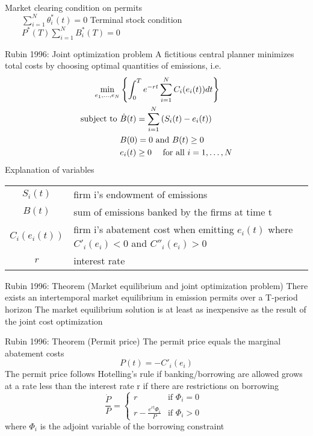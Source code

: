 	Market clearing condition on permits \\
		$
		\qquad \sum_{i=1}^N \theta_i^*(t) = 0
		$
 Terminal stock condition \\
		$
		\qquad P^*(T)\sum_{i=1}^N B^*_i(T) = 0
		$




Rubin 1996: Joint optimization problem
	A fictitious central planner minimizes total costs by choosing optimal quantities of emissions, i.e.
		\begin{align}
		\min_{e_1, \ldots, e_N} &\left\{ \int_0^T e^{-rt} \sum_{i=1}^N C_i(e_i(t)) dt \right\} \\
		\textnormal{subject to }
		&\dot{B}(t) = \sum_{i=1}^N \left(S_i(t) - e_i(t)\right) \\
		&            B(0) = 0 \textnormal{ and } B(t) \ge 0 \\
		&            e_i(t) \ge 0 \quad \textnormal{ for all } i = 1, \ldots, N
		\end{align}
	{Explanation of variables}
		\begin{tiny}
		\begin{tabular}{cl}
		$S_i(t)$ & firm i's endowment of emissions \\
		$B(t)$ & sum of emissions banked by the firms at time t\\
		$C_i(e_i(t))$ & firm i's abatement cost when emitting $e_i(t)$ where $C'_i(e_i) < 0$ and $C''_i(e_i) > 0$ \\
		$r$ & interest rate \\
		\end{tabular}
		\end{tiny}


Rubin 1996: Theorem (Market equilibrium and joint optimization problem)
	There exists an intertemporal market equilibrium in emission permits over a T-period horizon
	The market equilibrium solution is at least as inexpensive as the result of the joint cost optimization


Rubin 1996: Theorem (Permit price)
	The permit price equals the marginal abatement costs
		\[
		P(t) = - C'_i(e_i)
		\]
	The permit price 
		follows Hotelling's rule if banking/borrowing are allowed
		grows at a rate less than the interest rate r if there are restrictions on borrowing
		\[
		\frac{\dot{P}}{P} =
				\left\{ \begin{array}{ll}
					r  &
						\mbox{if $\Phi_i = 0$ } \\
					r - \frac{e^{rt}\Phi_i}{P} &
						\mbox{if $\Phi_i > 0$}
				\end{array}
				\right.
		\]
		where $\Phi_i$ is the adjoint variable of the borrowing constraint


